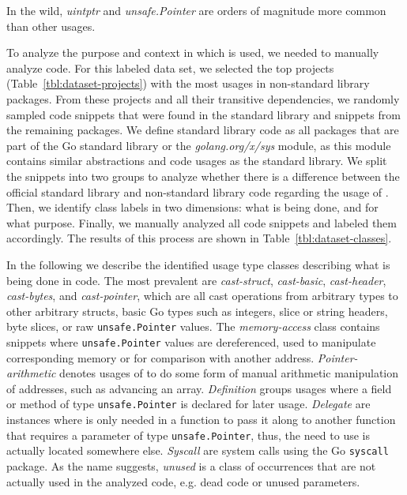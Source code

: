 \begin{tcolorbox}[boxsep=1pt, enlarge top by=5pt, title=Answer to \ref{rq:distTypes}]
In the wild, \textit{uintptr} and \textit{unsafe.Pointer} are orders of magnitude more common than other \unsafe{} usages.
\end{tcolorbox}



To analyze the purpose and context in which \unsafe{} is used, we needed to manually analyze code.
For this labeled data set, we selected the top  projects (Table~\ref{tbl:dataset-projects}) with the most \unsafe{} usages in non-standard library packages.
From these projects and all their transitive dependencies, we randomly sampled  code snippets that were found in the standard library and  snippets from the remaining packages.
We define standard library code as all packages that are part of the Go standard library or the \textit{golang.org/x/sys} module, as this module contains similar abstractions and code usages as the standard library.
We split the snippets into two groups to analyze whether there is a difference between the official standard library and non-standard library code regarding the usage of \unsafe{}.
Then, we identify class labels in two dimensions: what is being done, and for what purpose. 
Finally, we manually analyzed all  code snippets and labeled them accordingly.
The results of this process are shown in Table~\ref{tbl:dataset-classes}.




In the following we describe the identified usage type classes describing what is being done in code.
The most prevalent are \textit{cast-struct}, \textit{cast-basic}, \textit{cast-header}, \textit{cast-bytes}, and \textit{cast-pointer}, which are all cast operations from arbitrary types to other arbitrary structs, basic Go types such as integers, slice or string headers, byte slices, or raw \texttt{unsafe.Pointer} values.
The \textit{memory-access} class contains snippets where \texttt{unsafe.Pointer} values are dereferenced, used  to manipulate corresponding memory or for comparison with another address.
\textit{Pointer-arithmetic} denotes usages of \unsafe{} to do some form of manual arithmetic manipulation of addresses, such as advancing an array.
\textit{Definition} groups usages where a field or method of type \texttt{unsafe.Pointer} is declared for later usage.
\textit{Delegate} are instances where \unsafe{} is only needed in a function to pass it along to another function that requires a parameter of type \texttt{unsafe.Pointer}, thus, the need to use \unsafe{} is actually located somewhere else.
\textit{Syscall} are system calls using the Go \texttt{syscall} package.
As the name suggests, \textit{unused} is a class of occurrences that are not actually used in the analyzed code, e.g. dead code or unused parameters.

